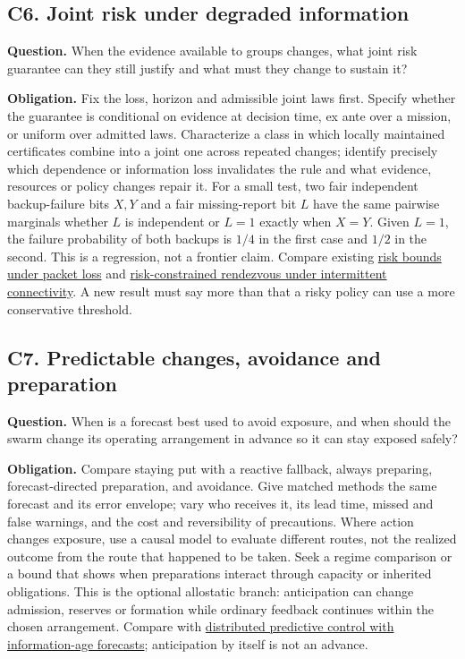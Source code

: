 \documentclass[11pt]{article}
\begin{document}
\subsection{C6. Joint risk under degraded information}
\textbf{Question.} When the evidence available to groups changes, what joint risk guarantee can they still justify and what must they change to sustain it?

\textbf{Obligation.} Fix the loss, horizon and admissible joint laws first. Specify whether the guarantee is conditional on evidence at decision time, ex ante over a mission, or uniform over admitted laws. Characterize a class in which locally maintained certificates combine into a joint one across repeated changes; identify precisely which dependence or information loss invalidates the rule and what evidence, resources or policy changes repair it. For a small test, two fair independent backup-failure bits \(X,Y\) and a fair missing-report bit \(L\) have the same pairwise marginals whether \(L\) is independent or \(L=1\) exactly when \(X=Y\). Given \(L=1\), the failure probability of both backups is \(1/4\) in the first case and \(1/2\) in the second. This is a regression, not a frontier claim. Compare existing \href{https://ieeexplore.ieee.org/document/8744598}{risk bounds under packet loss} and \href{https://doi.org/10.1007/s10514-025-10231-6}{risk-constrained rendezvous under intermittent connectivity}. A new result must say more than that a risky policy can use a more conservative threshold.

\subsection{C7. Predictable changes, avoidance and preparation}
\textbf{Question.} When is a forecast best used to avoid exposure, and when should the swarm change its operating arrangement in advance so it can stay exposed safely?

\textbf{Obligation.} Compare staying put with a reactive fallback, always preparing, forecast-directed preparation, and avoidance. Give matched methods the same forecast and its error envelope; vary who receives it, its lead time, missed and false warnings, and the cost and reversibility of precautions. Where action changes exposure, use a causal model to evaluate different routes, not the realized outcome from the route that happened to be taken. Seek a regime comparison or a bound that shows when preparations interact through capacity or inherited obligations. This is the optional allostatic branch: anticipation can change admission, reserves or formation while ordinary feedback continues within the chosen arrangement. Compare with \href{https://arxiv.org/abs/2103.05526}{distributed predictive control with information-age forecasts}; anticipation by itself is not an advance.
\end{document}
